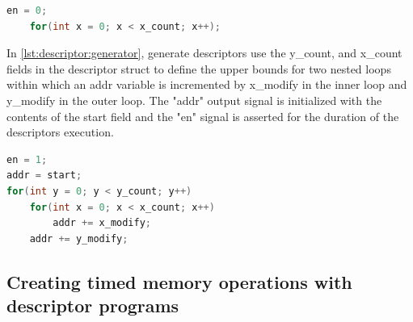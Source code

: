 \begin{lstlisting}[language=C, caption=Descriptor as a set of loops, label={lst:descriptor:wait}]
    en = 0;
    for(int x = 0; x < x_count; x++);
\end{lstlisting}

In \autoref{lst:descriptor:generator}, generate descriptors use the y\_count,
and x\_count fields in the descriptor struct to define the upper bounds for two
nested loops within which an addr variable is incremented by x\_modify in the
inner loop and y\_modify in the outer loop. The "addr" output signal is
initialized with the contents of the start field and the "en" signal is asserted
for the duration of the descriptors execution.

\begin{lstlisting}[language=C, caption=Descriptor as a set of loops, label={lst:descriptor:generator}]
en = 1;
addr = start;
for(int y = 0; y < y_count; y++)
    for(int x = 0; x < x_count; x++)
        addr += x_modify;
    addr += y_modify;
\end{lstlisting}



\subsection{Creating timed memory operations with descriptor programs}
\label{chap:data_orchestration:sams:memory_transactions}


